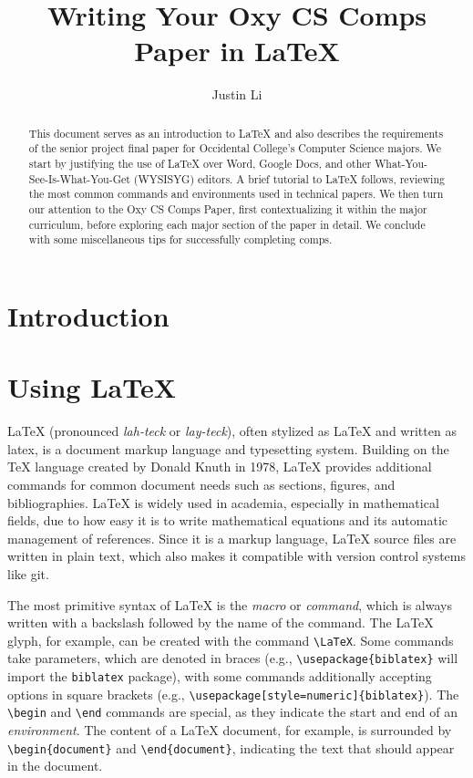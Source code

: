 \documentclass[10pt,twocolumn]{article}
\title{Writing Your Oxy CS Comps Paper in \LaTeX}
\author{Justin Li}
\affiliation{Occidental College}
\begin{document}
\maketitle

\begin{abstract}
    This document serves as an introduction to {\LaTeX} and also describes the requirements of the senior project final paper for Occidental College's Computer Science majors.
    We start by justifying the use of {\LaTeX} over Word, Google Docs, and other What-You-See-Is-What-You-Get (WYSISYG) editors.
    A brief tutorial to {\LaTeX} follows, reviewing the most common commands and environments used in technical papers.
    We then turn our attention to the Oxy CS Comps Paper, first contextualizing it within the major curriculum, before exploring each major section of the paper in detail.
    We conclude with some miscellaneous tips for successfully completing comps.
\end{abstract}

\section{Introduction}

\section{Using \LaTeX}

LaTeX (pronounced \textit{lah-teck} or \textit{lay-teck}), often stylized as {\LaTeX} and written as latex, is a document markup language and typesetting system.
Building on the {\TeX} language created by Donald Knuth in 1978, LaTeX provides additional commands for common document needs such as sections, figures, and bibliographies.
LaTeX is widely used in academia, especially in mathematical fields, due to how easy it is to write mathematical equations and its automatic management of references.
Since it is a markup language, LaTeX source files are written in plain text, which also makes it compatible with version control systems like git.

The most primitive syntax of LaTeX is the \textit{macro} or \textit{command}, which is always written with a backslash followed by the name of the command.
The {\LaTeX} glyph, for example, can be created with the command \texttt{\textbackslash LaTeX}.
Some commands take parameters, which are denoted in braces (e.g., \texttt{\textbackslash usepackage\{biblatex\}} will import the \texttt{biblatex} package), with some commands additionally accepting options in square brackets (e.g., \texttt{\textbackslash usepackage[style=numeric]\{biblatex\}}).
The \texttt{\textbackslash begin} and \texttt{\textbackslash end} commands are special, as they indicate the start and end of an \textit{environment}.
The content of a LaTeX document, for example, is surrounded by \texttt{\textbackslash begin\{document\}} and \texttt{\textbackslash end\{document\}}, indicating the text that should appear in the document.
\end{document}

